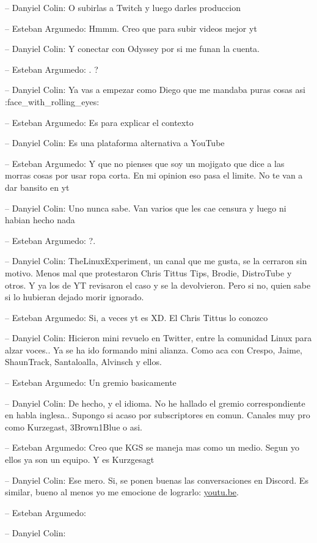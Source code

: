 -- Danyiel Colin: O subirlas a Twitch y luego darles produccion

-- Esteban Argumedo: Hmmm. Creo que para subir videos mejor yt

-- Danyiel Colin: Y conectar con Odyssey por si me funan la cuenta.

-- Esteban Argumedo: . ?

-- Danyiel Colin: Ya vas a empezar como Diego que me mandaba puras cosas
asi :face\_with\_rolling\_eyes:

-- Esteban Argumedo: Es para explicar el contexto

-- Danyiel Colin: Es una plataforma alternativa a YouTube

-- Esteban Argumedo: Y que no pienses que soy un mojigato que dice a las
morras cosas por usar ropa corta. En mi opinion eso pasa el limite. No
te van a dar bansito en yt

-- Danyiel Colin: Uno nunca sabe. Van varios que les cae censura y luego
ni habian hecho nada

-- Esteban Argumedo: ?.

-- Danyiel Colin: TheLinuxExperiment, un canal que me gusta, se la
cerraron sin motivo. Menos mal que protestaron Chris Tittus Tips,
Brodie, DistroTube y otros. Y ya los de YT revisaron el caso y se la
devolvieron. Pero si no, quien sabe si lo hubieran dejado morir
ignorado.

-- Esteban Argumedo: Si, a veces yt es XD. El Chris Tittus lo conozco

-- Danyiel Colin: Hicieron mini revuelo en Twitter, entre la comunidad
Linux para alzar voces.. Ya se ha ido formando mini alianza. Como aca
con Crespo, Jaime, ShaunTrack, Santaloalla, Alvinsch y ellos.

-- Esteban Argumedo: Un gremio basicamente

-- Danyiel Colin: De hecho, y el idioma. No he hallado el gremio
correspondiente en habla inglesa.. Supongo si acaso por subscriptores en
comun. Canales muy pro como Kurzegast, 3Brown1Blue o asi.

-- Esteban Argumedo: Creo que KGS se maneja mas como un medio. Segun yo
ellos ya son un equipo. Y es Kurzgesagt

-- Danyiel Colin: Ese mero. Si, se ponen buenas las conversaciones en
Discord. Es similar, bueno al menos yo me emocione de lograrlo:
\href{https://youtu.be/Nr_miheqFU4?t=20}{youtu.be}.

-- Esteban Argumedo:

-- Danyiel Colin:

